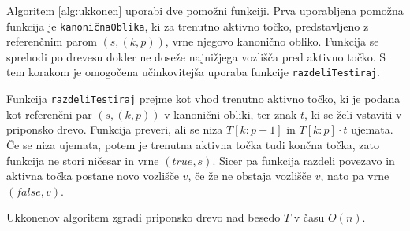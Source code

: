 Algoritem \ref{alg:ukkonen} uporabi dve pomožni funkciji. Prva uporabljena pomožna funkcija je \texttt{kanoničnaOblika}, ki za trenutno aktivno točko, predstavljeno z referenčnim parom $(s,(k, p))$, vrne njegovo kanonično obliko. Funkcija se sprehodi po drevesu dokler ne doseže najnižjega vozlišča pred aktivno točko. S tem korakom je omogočena učinkovitejša uporaba funkcije \texttt{razdeliTestiraj}.

Funkcija \texttt{razdeliTestiraj} prejme kot vhod trenutno aktivno točko, ki je podana kot referenčni par $(s,(k,p))$ v kanonični obliki, ter znak $t$, ki se želi vstaviti v priponsko drevo. Funkcija preveri, ali se niza $T[k:p+1]$ in $T[k:p]\cdot t$ ujemata. Če se niza ujemata, potem je trenutna aktivna točka tudi končna točka, zato funkcija ne stori ničesar in vrne $(\textit{true},s)$. Sicer pa funkcija razdeli povezavo in aktivna točka postane novo vozlišče $v$, če že ne obstaja vozlišče $v$, nato pa vrne $(\textit{false},v)$. 


\begin{izr} \label{izr:ukkonen}
    Ukkonenov algoritem zgradi priponsko drevo nad besedo $T$ v času $O(n)$.
\end{izr}


